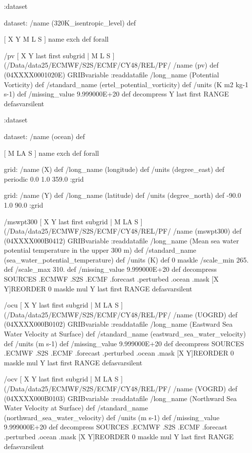 \begin{ingrid}
:dataset

dataset:
/name (320K_isentropic_level) def

[ X Y M L S ] { name exch def } forall

/pv { [ X Y last first subgrid | M L S ] (/Data/data25/ECMWF/S2S/ECMF/CY48/REL/PF/%
/name (pv) def
(04XXXX0001020E) GRIBvariable
:readdatafile
/long_name (Potential Vorticity) def
/standard_name (ertel_potential_vorticity) def
/units (K m2 kg-1 s-1) def
/missing_value 9.999000E+20 def
decompress
Y last first RANGE
} defasvarsilent

:dataset

dataset:
/name (ocean) def

[ M LA S ] {name exch def } forall

grid:
/name (X) def
/long_name (longitude) def
/units (degree_east) def
periodic
0.0 1.0 359.0
:grid

grid:
/name (Y) def
/long_name (latitude) def
/units (degree_north) def
-90.0 1.0 90.0
:grid

/mswpt300 { [ X Y last first subgrid | M LA S ] (/Data/data25/ECMWF/S2S/ECMF/CY48/REL/PF/%
/name (mswpt300) def
(04XXXX000B0412) GRIBvariable
:readdatafile
/long_name (Mean sea water potential temperature in the upper 300 m) def
/standard_name (sea_water_potential_temperature) def
/units (K) def
0 maskle
/scale_min 265. def
/scale_max 310. def
/missing_value 9.999000E+20 def
decompress
  SOURCES .ECMWF .S2S .ECMF .forecast .perturbed .ocean .mask
  [X Y]REORDER
   0 maskle
   mul
Y last first RANGE
} defasvarsilent

/ocu { [ X Y last first subgrid | M LA S ] (/Data/data25/ECMWF/S2S/ECMF/CY48/REL/PF/%
/name (UOGRD) def
(04XXXX000B0102) GRIBvariable
:readdatafile
/long_name (Eastward Sea Water Velocity at Surface) def
/standard_name (eastward_sea_water_velocity) def
/units (m s-1) def
/missing_value 9.999000E+20 def
decompress
  SOURCES .ECMWF .S2S .ECMF .forecast .perturbed .ocean .mask
  [X Y]REORDER
   0 maskle
   mul
Y last first RANGE
} defasvarsilent

/ocv { [ X Y last first subgrid | M LA S ] (/Data/data25/ECMWF/S2S/ECMF/CY48/REL/PF/%
/name (VOGRD) def
(04XXXX000B0103) GRIBvariable
:readdatafile
/long_name (Northward Sea Water Velocity at Surface) def
/standard_name (northward_sea_water_velocity) def
/units (m s-1) def
/missing_value 9.999000E+20 def
decompress
  SOURCES .ECMWF .S2S .ECMF .forecast .perturbed .ocean .mask
  [X Y]REORDER
   0 maskle
   mul
Y last first RANGE
} defasvarsilent


\end{ingrid}
